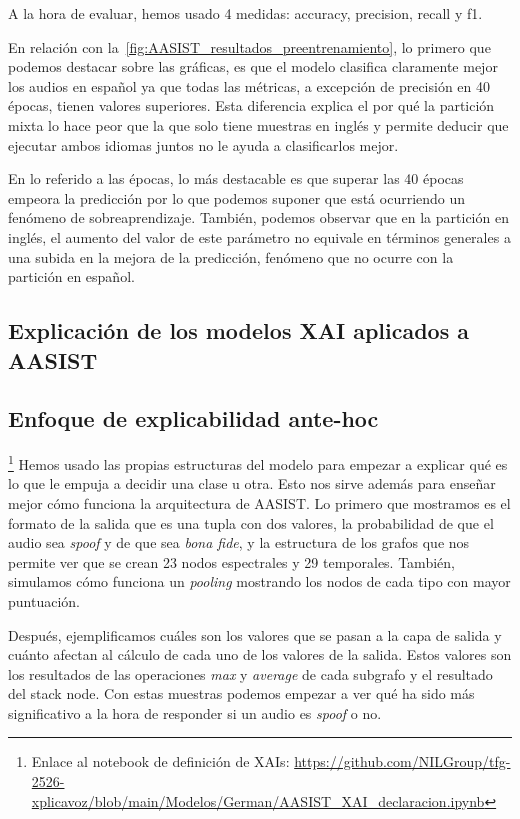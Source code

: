 A la hora de evaluar, hemos usado 4 medidas: accuracy, precision, recall y f1.

En relación con la~\autoref{fig:AASIST_resultados_preentrenamiento}, lo primero que podemos destacar sobre las gráficas, es que el modelo clasifica claramente mejor los audios en español ya que todas las métricas, a excepción de precisión en 40 épocas, tienen valores superiores. Esta diferencia explica el por qué la partición mixta lo hace peor que la que solo tiene muestras en inglés y permite deducir que ejecutar ambos idiomas juntos no le ayuda a clasificarlos mejor.

En lo referido a las épocas, lo más destacable es que superar las 40 épocas empeora la predicción por lo que podemos suponer que está ocurriendo un fenómeno de sobreaprendizaje. También, podemos observar que en la partición en inglés, el aumento del valor de este parámetro no equivale en términos generales a una subida en la mejora de la predicción, fenómeno que no ocurre con la partición en español.

\subsection*{Explicación de los modelos XAI aplicados a AASIST}
\subsection*{Enfoque de explicabilidad ante-hoc}
\footnote{Enlace al notebook de definición de XAIs: \url{https://github.com/NILGroup/tfg-2526-xplicavoz/blob/main/Modelos/German/AASIST_XAI_declaracion.ipynb}}
Hemos usado las propias estructuras del modelo para empezar a explicar qué es lo que le empuja a decidir una clase u otra. Esto nos sirve además para enseñar mejor cómo funciona la arquitectura de AASIST.
Lo primero que mostramos es el formato de la salida que es una tupla con dos valores, la probabilidad de que el audio sea \textit{spoof} y de que sea \textit{bona fide}, y la estructura de los grafos que nos permite ver que se crean 23 nodos espectrales y 29 temporales. También, simulamos cómo funciona un \textit{pooling} mostrando los nodos de cada tipo con mayor puntuación.

Después,  ejemplificamos cuáles son los valores que se pasan a la capa de salida y cuánto afectan al cálculo de cada uno de los valores de la salida. Estos valores son los resultados de las operaciones \textit{max} y \textit{average} de cada subgrafo y el resultado del stack node. Con estas muestras podemos empezar a ver qué ha sido más significativo a la hora de responder si un audio es \textit{spoof} o no.

